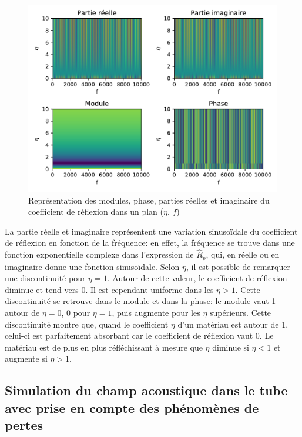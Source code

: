 \documentclass[a4paper,11pt]{article}
\begin{document}
\begin{figure}[H]
	\centering 
	\includegraphics[width=\linewidth]{Figures/coef_refl.pdf}
	\caption{Représentation des modules, phase, parties réelles et imaginaire du coefficient de réflexion dans un plan ($\eta$, $f$)}
	\label{fig:coef_refl}
\end{figure}

La partie réelle et imaginaire représentent une variation sinusoïdale du coefficient de réflexion en fonction de la fréquence: en effet, la fréquence se trouve dans une fonction exponentielle complexe dans l'expression de $\hat{R}_p$, qui, en réelle ou en imaginaire donne une fonction sinusoïdale. Selon $\eta$, il est possible de remarquer une discontinuité pour $\eta = 1$. Autour de cette valeur, le coefficient de réflexion diminue et tend vers 0. Il est cependant uniforme dans les $\eta > 1$. Cette discontinuité se retrouve dans le module et dans la phase: le module vaut 1 autour de $\eta = 0$, 0 pour $\eta = 1$, puis augmente pour les $\eta$ supérieurs. Cette discontinuité montre que, quand le coefficient $\eta$ d'un matériau est autour de 1, celui-ci est parfaitement absorbant car le coefficient de réflexion vaut 0. Le matériau est de plus en plus réfléchissant à mesure que $\eta$ diminue si $\eta < 1$ et augmente si $\eta > 1$.  

\subsection{Simulation du champ acoustique dans le tube avec prise en compte des phénomènes de pertes}
\end{document}
